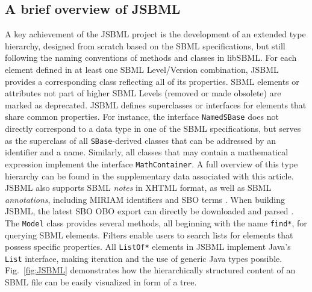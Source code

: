 \documentclass{bioinfo}
\begin{document}
\begin{methods}
\section{A brief overview of JSBML}

A key achievement of the JSBML project is the development of an extended type
hierarchy, designed from scratch based on the SBML specifications, but still
following the naming conventions of methods and classes in
libSBML. For each element defined in at least one SBML Level/Version combination,
JSBML provides a corresponding class reflecting all of its properties. SBML
elements or attributes not part of higher SBML Levels (removed or made
obsolete) are marked as deprecated. JSBML defines superclasses or interfaces for
elements that share common properties. For instance, the interface
\texttt{NamedSBase} does not directly correspond to a data type in one of the
SBML specifications, but serves as the superclass of all \texttt{SBase}-derived
classes that can be addressed by an identifier and a name. Similarly, all classes
that may contain a mathematical expression implement the
interface \texttt{MathContainer}. A full overview of this type hierarchy can be
found in the supplementary data associated with this article. JSBML also
supports SBML \emph{notes} in XHTML format, as well as SBML
\emph{annotations}, including MIRIAM identifiers \citep{Novere2005} and
SBO terms \citep{Novere2006b}.
When building JSBML, the latest SBO OBO export can directly be downloaded and
parsed \citep{Holland2008}.
The \texttt{Model} class provides several methods, all beginning with the name
\texttt{find*}, for querying SBML elements. Filters enable users to search lists
for elements that possess specific properties. All \texttt{ListOf*} elements in
JSBML implement Java's \texttt{List} interface, making iteration and the use of
generic Java types possible. Fig.~\ref{fig:JSBML} demonstrates how the
hierarchically structured content of an SBML file can be easily visualized in form
of a tree.
\begin{figure}
\centerline{
  }
\end{figure}
\end{methods}
\end{document}
